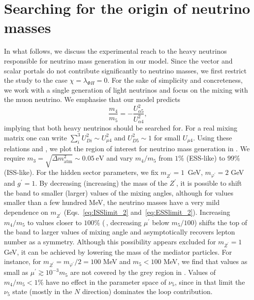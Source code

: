\section{Searching for the origin of neutrino masses} \label{sec:pure_nu_mixing}

In what follows, we discuss the experimental reach to the heavy neutrinos responsible for neutrino mass generation in our model. Since the vector and scalar portals do not contribute significantly to neutrino masses, we first restrict the study to the case $\chi=\lambda_{\Phi H}=0$. For the sake of simplicity and concreteness, we work with a single generation of light neutrinos and focus on the mixing with the muon neutrino. We emphasise that our model predicts
%
\begin{equation}
    \frac{m_4}{m_5} = - \frac{U_{\alpha 5}^2}{U_{\alpha 4}^2},
\end{equation}
%
implying that both heavy neutrinos should be searched for.
%
For a real mixing matrix one can write $\sum_i^3 U_{D i}^{2} \sim U_{\mu 4}^{2}$ and $U_{D 5}^{2} \sim 1$ for small $U_{\mu 4}$. Using these relations and , we plot the region of interest for neutrino mass generation in . We require $m_3 = 
\sqrt{\Delta m^2_{\text{atm}}} \sim 0.05~\text{eV}$ and vary $m_4/m_5$ from $1\%$ (ESS-like) to $99\%$ (ISS-like). For the hidden sector parameters, we fix $m_{Z^\prime}=1$~GeV, $m_{\varphi^\prime} = 2$ GeV and $g^\prime = 1$. By decreasing (increasing) the mass of the $Z^\prime$, it is possible to shift the band to smaller (larger) values of the mixing angles, although for values smaller than a few hundred MeV, the neutrino masses have a very mild dependence on $m_{Z^\prime}$ (Eqs.~\ref{eq:ISSlimit_2} and~\ref{eq:ESSlimit_2}). Increasing $m_4/m_5$ to values closer to $100\%$ (\ie\,, decreasing $\mu^\prime$ below $m_5/100$) shifts the top of the band to larger values of mixing angle and asymptotically recovers lepton number as a symmetry. Although this possibility appears excluded for $m_{Z^\prime} = 1$ GeV, it can be achieved by lowering the mass of the mediator particles. For instance, for $m_{Z^\prime} = m_{\varphi^\prime}/2 = 100$ MeV and $m_5 < 100$ MeV, we find that values as small as $\mu^\prime \gtrsim 10^{-3} m_5$ are not covered by the grey region in .
Values of $m_4/m_5 < 1\%$ have no effect in the parameter space of $\nu_5$, since in that limit the $\nu_5$ state (mostly in the $N$ direction) dominates the loop contribution.

